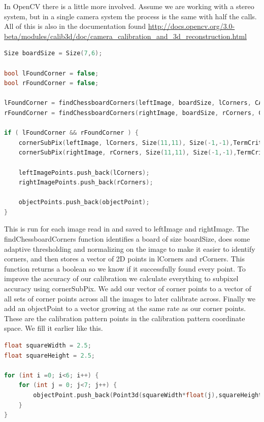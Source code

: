 \documentclass{article}
\begin{document}
In OpenCV there is a little more involved. Assume we are working with a stereo system, but in a single camera system the process is the same with half the calls. All of this is also in the documentation found \url{http://docs.opencv.org/3.0-beta/modules/calib3d/doc/camera_calibration_and_3d_reconstruction.html}

\begin{lstlisting}[language=C++, frame=single, breaklines]
Size boardSize = Size(7,6);

bool lFoundCorner = false;
bool rFoundCorner = false;

lFoundCorner = findChessboardCorners(leftImage, boardSize, lCorners, CALIB_CB_ADAPTIVE_THRESH|CALIB_CB_NORMALIZE_IMAGE);
rFoundCorner = findChessboardCorners(rightImage, boardSize, rCorners, CALIB_CB_ADAPTIVE_THRESH|CALIB_CB_NORMALIZE_IMAGE);

if ( lFoundCorner && rFoundCorner ) {
	cornerSubPix(leftImage, lCorners, Size(11,11), Size(-1,-1),TermCriteria(TermCriteria::MAX_ITER|TermCriteria::EPS,30, 0.01));
	cornerSubPix(rightImage, rCorners, Size(11,11), Size(-1,-1),TermCriteria(TermCriteria::MAX_ITER|TermCriteria::EPS,30, 0.01));
	
	leftImagePoints.push_back(lCorners);
	rightImagePoints.push_back(rCorners);
	
	objectPoints.push_back(objectPoint);
}
\end{lstlisting}

This is run for each image read in and saved to leftImage and rightImage. The findChessboardCorners function identifies a board of size boardSize, does some adaptive thresholding and normalizing on the image to make it easier to identify corners, and then stores a vector of 2D points in lCorners and rCorners. This function returns a boolean so we know if it successfully found every point. To improve the accuracy of our calibration we calculate everything to subpixel accuracy using cornerSubPix. We add our vector of corner points to a vector of all sets of corner points across all the images to later calibrate across. Finally we add an objectPoint to a vector growing at the same rate as our corner points. These are the calibration pattern points in the calibration pattern coordinate space. We fill it earlier like this. 

\begin{lstlisting}[language=C++, frame=single, breaklines]
float squareWidth = 2.5;
float squareHeight = 2.5;

for (int i =0; i<6; i++) {
	for (int j = 0; j<7; j++) {
		objectPoint.push_back(Point3d(squareWidth*float(j),squareHeight*float(i),0));
	}
}
\end{lstlisting}
\end{document}
